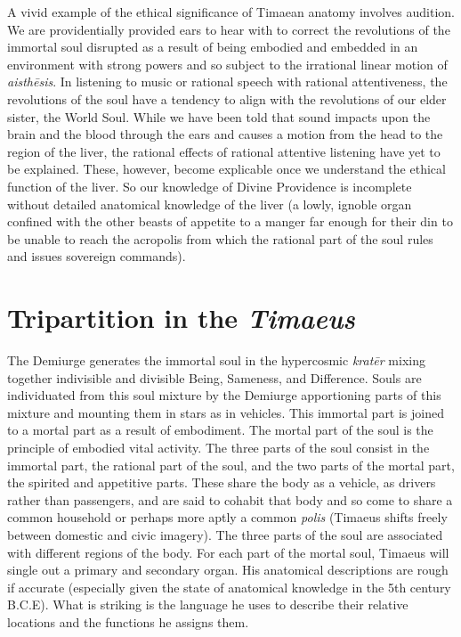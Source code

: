 A vivid example of the ethical significance of Timaean anatomy involves audition. We are providentially provided ears to hear with to correct the revolutions of the immortal soul disrupted as a result of being embodied and embedded in an environment with strong powers and so subject to the irrational linear motion of \emph{aisthēsis}. In listening to music or rational speech with rational attentiveness, the revolutions of the soul have a tendency to align with the revolutions of our elder sister, the World Soul. While we have been told that sound impacts upon the brain and the blood through the ears and causes a motion from the head to the region of the liver, the rational effects of rational attentive listening have yet to be explained. These, however, become explicable once we understand the ethical function of the liver. So our knowledge of Divine Providence is incomplete without detailed anatomical knowledge of the liver (a lowly, ignoble organ confined with the other beasts of appetite to a manger far enough for their din to be unable to reach the acropolis from which the rational part of the soul rules and issues sovereign commands).


\section{Tripartition in the \emph{Timaeus}} %
\label{sec:tripartition_in_the_emph_timaeus}

The Demiurge generates the immortal soul in the hypercosmic \emph{kratēr} mixing together indivisible and divisible Being, Sameness, and Difference. Souls are individuated from this soul mixture by the Demiurge apportioning parts of this mixture and mounting them in stars as in vehicles. This immortal part is joined to a mortal part as a result of embodiment. The mortal part of the soul is the principle of embodied vital activity. The three parts of the soul consist in the immortal part, the rational part of the soul, and the two parts of the mortal part, the spirited and appetitive parts. These share the body as a vehicle, as drivers rather than passengers, and are said to cohabit that body and so come to share a common household or perhaps more aptly a common \emph{polis} (Timaeus shifts freely between domestic and civic imagery). The three parts of the soul are associated with different regions of the body. For each part of the mortal soul, Timaeus will single out a primary and secondary organ. His anatomical descriptions are rough if accurate (especially given the state of anatomical knowledge in the 5th century B.C.E). What is striking is the language he uses to describe their relative locations and the functions he assigns them. 


